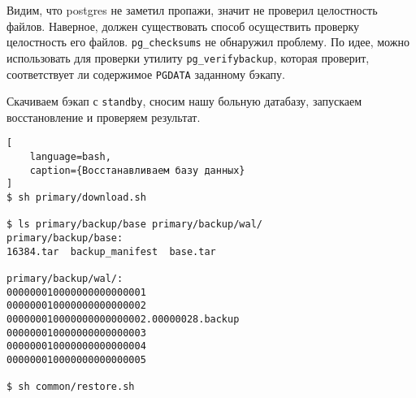 \documentclass{article}
\begin{document}
Видим, что postgres не заметил пропажи, значит не проверил целостность файлов. Наверное, должен существовать способ осуществить проверку целостность его файлов. \texttt{pg\_checksums} не обнаружил проблему. По идее, можно использовать для проверки утилиту \texttt{pg\_verifybackup}, которая проверит, соответствует ли содержимое \texttt{PGDATA} заданному бэкапу.

Скачиваем бэкап с \texttt{standby}, сносим нашу больную датабазу, запускаем восстановление и проверяем результат.

\begin{lstlisting}[
    language=bash,
    caption={Восстанавливаем базу данных}
]
$ sh primary/download.sh 

$ ls primary/backup/base primary/backup/wal/
primary/backup/base:
16384.tar  backup_manifest  base.tar

primary/backup/wal/:
000000010000000000000001
000000010000000000000002
000000010000000000000002.00000028.backup
000000010000000000000003
000000010000000000000004
000000010000000000000005

$ sh common/restore.sh 

\end{lstlisting}
\end{document}

